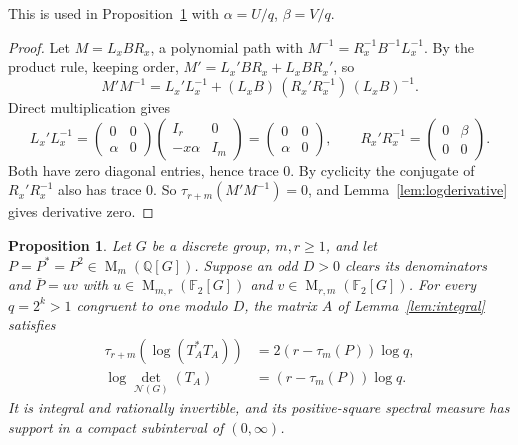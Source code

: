 \documentclass[11pt]{article}
\newtheorem{proposition}[theorem]{Proposition}
\theoremstyle{remark}
\numberwithin{equation}{section}
\newcommand{\F}{\mathbb F}
\newcommand{\Q}{\mathbb Q}
\newcommand{\Mat}{\operatorname{M}}
\newcommand{\N}{\mathcal N}
\begin{document}
This is used in Proposition~\ref{prop:criterion} with $\alpha=U/q$, $\beta=V/q$.

\begin{proof}
Let $M=L_xBR_x$, a polynomial path with $M^{-1}=R_x^{-1}B^{-1}L_x^{-1}$. By the product rule, keeping order, $M'=L_x'BR_x+L_xBR_x'$, so
\[
 M'M^{-1}=L_x'L_x^{-1}
 +(L_xB)\,(R_x'R_x^{-1})\,(L_xB)^{-1}.
\]
Direct multiplication gives
\[
 L_x'L_x^{-1}=\begin{pmatrix}0&0\\\alpha&0\end{pmatrix}\begin{pmatrix}I_r&0\\-x\alpha&I_m\end{pmatrix}=\begin{pmatrix}0&0\\\alpha&0\end{pmatrix},\qquad
 R_x'R_x^{-1}=\begin{pmatrix}0&\beta\\0&0\end{pmatrix}.
\]
Both have zero diagonal entries, hence trace $0$. By cyclicity the conjugate of $R_x'R_x^{-1}$ also has trace $0$. So $\tau_{r+m}(M'M^{-1})=0$, and Lemma~\ref{lem:logderivative} gives derivative zero.
\end{proof}

\begin{proposition}\label{prop:criterion}
Let $G$ be a discrete group, $m,r\ge1$, and let
$P=P^*=P^2\in\Mat_m(\Q[G])$. Suppose an odd $D>0$ clears its
denominators and $\bar P=uv$ with
$u\in\Mat_{m,r}(\F_2[G])$ and
$v\in\Mat_{r,m}(\F_2[G])$. For every $q=2^k>1$ congruent to one
modulo $D$, the matrix $A$ of Lemma~\ref{lem:integral} satisfies
\begin{align}
 \tau_{r+m}(\log(T_A^*T_A))
   &=2(r-\tau_m(P))\log q,\label{eq:criterion-trace}\\
 \log\det_{\N(G)}(T_A)&=(r-\tau_m(P))\log q.
 \label{eq:criterion-det}
\end{align}
It is integral and rationally invertible, and its positive-square
spectral measure has support in a compact subinterval of $(0,\infty)$.
\end{proposition}
\end{document}
